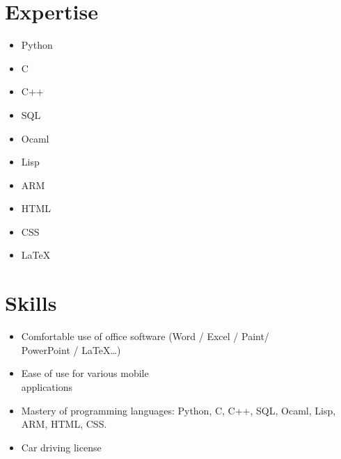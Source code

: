 \documentclass[9pt, oneside, a4paper, titlepage]{extarticle}
\begin{document}
\begin{tcolorbox}
\begin{minipage}[t]{6.2cm}
\begin{spacing}{0.95}
\begin{tcolorbox}[grow to left by = 0.6cm, colback = gray!25, colframe = white]
                \section*{Expertise}
                \begin{multicols}{2}
                \begin{itemize}
                    \item Python
                    \item C
                    \item C++
                    \item SQL
                    \item Ocaml
                    \columnbreak                    
                    \item Lisp
                    \item ARM
                    \item HTML
                    \item CSS
                    \item \LaTeX
                \end{itemize}
                \end{multicols}
                \vspace*{0.2cm}
                \section*{Skills}

                \begin{itemize}
                    \vspace*{0.3cm}
                    \item Comfortable use of office software (Word / Excel / Paint/ \\PowerPoint / \LaTeX \ldots)
                    \vspace*{0.2cm}
                    \item Ease of use for various mobile \\applications
                    \vspace*{0.2cm}
                    \item Mastery of programming languages: Python, C, C++, SQL, Ocaml, Lisp, ARM, HTML, CSS.
                    \vspace*{0.2cm}
                    \item Car driving license\\

                \end{itemize}



\end{tcolorbox}
\end{spacing}
\end{minipage}
\end{tcolorbox}
\end{document}
